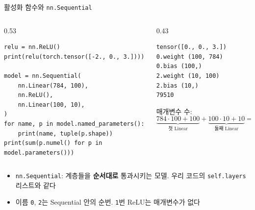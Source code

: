\documentclass[aspectratio=169,11pt]{beamer}
\newcommand{\code}[1]{\texttt{#1}}
\begin{document}
\begin{frame}[fragile]{활성화 함수와 \code{nn.Sequential}}
\begin{columns}[T,onlytextwidth]
\begin{column}{0.53\textwidth}
\begin{lstlisting}
relu = nn.ReLU()
print(relu(torch.tensor([-2., 0., 3.])))

model = nn.Sequential(
    nn.Linear(784, 100),
    nn.ReLU(),
    nn.Linear(100, 10),
)
for name, p in model.named_parameters():
    print(name, tuple(p.shape))
print(sum(p.numel() for p in model.parameters()))
\end{lstlisting}
\end{column}
\begin{column}{0.43\textwidth}
\begin{lstlisting}[style=outstyle]
tensor([0., 0., 3.])
0.weight (100, 784)
0.bias (100,)
2.weight (10, 100)
2.bias (10,)
79510
\end{lstlisting}
\vskip2mm
\small
매개변수 수:
\[
\underbrace{784\cdot100+100}_{\text{첫 Linear}}+\underbrace{100\cdot10+10}_{\text{둘째 Linear}}=79510
\]
\end{column}
\end{columns}
\vskip1mm
\begin{itemize}
\item \code{nn.Sequential}: 계층들을 \textbf{순서대로} 통과시키는 모델. 우리 코드의 \code{self.layers} 리스트와 같다
\item 이름 \code{0}, \code{2}는 Sequential 안의 순번. \code{1}번 ReLU는 매개변수가 없다
\end{itemize}
\end{frame}
\end{document}
